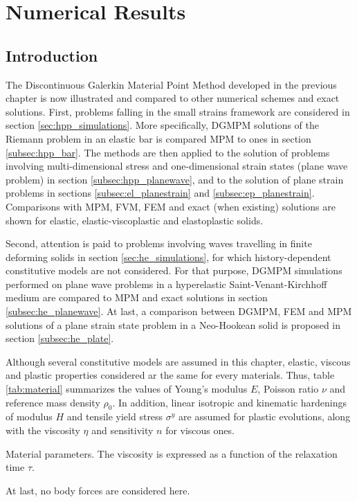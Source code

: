 \chapter{Numerical Results}
\section*{Introduction}
The Discontinuous Galerkin Material Point Method developed in the previous chapter is now illustrated and compared to other numerical schemes and exact solutions. 
First, problems falling in the small strains framework are considered in section \ref{sec:hpp_simulations}. More specifically, DGMPM solutions of the Riemann problem in an elastic bar is compared MPM to ones in section \ref{subsec:hpp_bar}. The methods are then applied to the solution of problems involving multi-dimensional stress and one-dimensional strain states (plane wave problem) in section \ref{subsec:hpp_planewave}, and to the solution of plane strain problems in sections \ref{subsec:el_planestrain} and \ref{subsec:ep_planestrain}. Comparisons with MPM, FVM, FEM and exact (when existing) solutions are shown for elastic, elastic-viscoplastic and elastoplastic solids.

Second, attention is paid to problems involving waves travelling in finite deforming solids in section \ref{sec:he_simulations}, for which history-dependent constitutive models are not considered.
For that purpose, DGMPM simulations performed on plane wave problems in a hyperelastic Saint-Venant-Kirchhoff medium are compared to MPM and exact solutions in section \ref{subsec:he_planewave}. At last, a comparison between DGMPM, FEM and MPM solutions of a plane strain state problem in a Neo-Hookean solid is proposed in section \ref{subsec:he_plate}.

Although several constitutive models are assumed in this chapter, elastic, viscous and plastic properties considered ar the same for every materials. Thus, table \ref{tab:material} summarizes the values of Young's modulus $E$, Poisson ratio $\nu$ and reference mass density $\rho_0$.
In addition, linear isotropic and kinematic hardenings of modulus $H$ and tensile yield stress $\sigma^y$ are assumed for plastic evolutions, along with the viscosity $\eta$ and sensitivity $n$ for viscous ones.
\begin{table}[h!]
  \centering
  
  \caption{Material parameters. The viscosity is expressed as a function of the relaxation time $\tau$.}
  \label{tab:material}
\end{table}
At last, no body forces are considered here.

